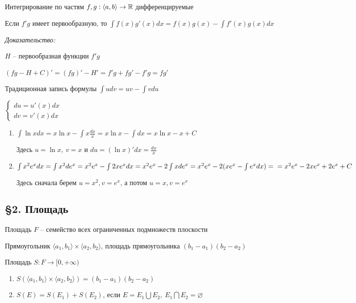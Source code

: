 \documentclass[12pt]{article}
\newcommand{\q}[1]{\langle #1 \rangle}
\begin{document}
\begin{theo}{Интегрирование по частям}
    $f, g : \q{a, b} \rightarrow \R$ дифференцируемые

    Если $f'g$ имеет первообразную, то $\int f(x)g'(x)dx = f(x)g(x) - \int f'(x)g(x)dx$
\end{theo}

\textit{Доказательство:}

$H$ -- первообразная функции $f'g$

$(fg - H + C)' = (fg)' - H' = f'g + fg' - f'g = fg'$

\begin{nota}{Традиционная запись формулы}
    $\int udv = uv - \int vdu$

    $\begin{cases}
        du = u'(x)dx \\
        dv = v'(x)dx
    \end{cases}$
\end{nota}

\begin{Example}{}
    \begin{enumerate}
        \item $\int \ln{x}dx = x\ln{x} - \int x \frac{dx}{x} = x\ln{x} - \int dx = x\ln{x} - x + C$
        
        Здесь $u = \ln{x},\ v = x$ и $du = (\ln{x})'dx = \frac{dx}{x}$ 

        \item $\int x^2 e^x dx = \int x^2 de^x = x^2 e^x - \int 2x e^x dx = x^2 e^x - 2\int xde^x = x^2e^x - 2(xe^x - \int e^xdx) = \\ = x^2e^x - 2xe^x + 2e^x + C$
        
        Здесь сначала берем $u = x^2, v = e^x$, а потом $u = x, v = e^x$
    \end{enumerate}
\end{Example}

\subsection{\S 2. Площадь}

\begin{defin}{Площадь}
    $F$ -- семейство всех ограниченных подмножеств плоскости

    Прямоугольник $\q{a_1, b_1} \times \q{a_2, b_2}$, площадь прямоугольника $(b_1 - a_1)(b_2 - a_2)$

    Площадь $S : F \rightarrow [0, + \infty)$

    \begin{enumerate}
        \item $S(\q{a_1, b_1} \times \q{a_2, b_2}) = (b_1 - a_1)(b_2 - a_2)$
        \item $S(E) = S(E_1) + S(E_2)$, если $E = E_1 \bigcup E_2,\ E_1 \bigcap E_2 = \varnothing$
    \end{enumerate}
\end{defin}
\end{document}

